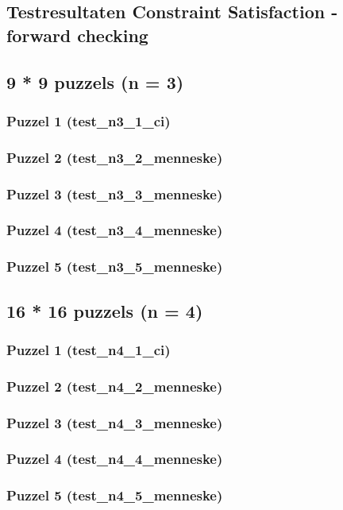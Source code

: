 \documentclass[]{report}
\begin{document}
\begin{appendices}
\chapter{Testresultaten Constraint Satisfaction - forward checking}
\section{9 * 9 puzzels (n = 3)}
\subsection{Puzzel 1 (test\_n3\_1\_ci)}

\subsection{Puzzel 2 (test\_n3\_2\_menneske)}
\subsection{Puzzel 3 (test\_n3\_3\_menneske)}
\subsection{Puzzel 4 (test\_n3\_4\_menneske)}
\subsection{Puzzel 5 (test\_n3\_5\_menneske)}
\section{16 * 16 puzzels (n = 4)}
\subsection{Puzzel 1 (test\_n4\_1\_ci)}

\subsection{Puzzel 2 (test\_n4\_2\_menneske)}
\subsection{Puzzel 3 (test\_n4\_3\_menneske)}
\subsection{Puzzel 4 (test\_n4\_4\_menneske)}
\subsection{Puzzel 5 (test\_n4\_5\_menneske)}

\end{appendices}
\end{document}
